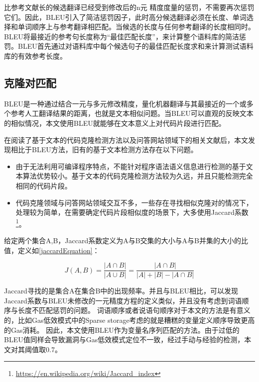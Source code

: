 比参考文献长的候选翻译已经受到修改后的n元 精度度量的惩罚，不需要再次惩罚它们。因此，BLEU引入了简洁惩罚因子，此时高分候选翻译必须在长度、单词选择和单词顺序上与参考翻译相匹配。当候选的长度与任何参考翻译的长度相同时。BLEU将最接近的参考句长度称为“最佳匹配长度”，来计算整个语料库的简洁惩罚。BLEU首先通过对语料库中每个候选句子的最佳匹配长度求和来计算测试语料库的有效参考长度。

\subsection{克隆对匹配}

BLEU是一种通过结合一元与多元修改精度，量化机器翻译与其最接近的一个或多个参考人工翻译结果的距离，也就是文本相似问题。当BLEU可以直观的反映文本的相似情况，本文使用BLEU就能够在文本意义上对代码片段进行匹配。

在阅读了基于文本的代码克隆检测方法以及问答网站领域下的相关文献后，本文发现相比于BLEU方法，旧有的基于文本检测方法存在以下问题。

\begin{itemize}
    \item 由于无法利用可编译程序特点，不能针对程序语法语义信息进行检测的基于文本算法优势较小。基于文本的代码克隆检测方法较为久远\cite{Ducasse}\cite{Koschke}，并且只能检测完全相同的代码片段。
    \item 代码克隆领域与问答网站领域交互不多，一些存在寻找相似克隆对的情况下，处理较为简单\cite{dicos}\cite{fisher1}，在需要确定代码片段相似度的场景下，大多使用Jaccard系数\footnote{{\url{https://en.wikipedia.org/wiki/Jaccard_index}}}。
\end{itemize}

给定两个集合A,B，Jaccard系数定义为A与B交集的大小与A与B并集的大小的比值，定义如\ref{jaccardEquation}：

\begin{equation}
    J\left ( A,B \right ) = \frac{|A\cap B|}{|A\cup B|} = \frac{|A\cap B|}{|A| + |B| - |A\cap B|}
    \label{jaccardEquation}
\end{equation}

Jaccard寻找的是集合A在集合B中的出现频率。并且与BLEU相比，可以发现Jaccard系数与BLEU\cite{bleu}未修改的一元精度方程的定义类似，并且没有考虑到词语顺序与长度不匹配惩罚的问题。
词语顺序或者说语句顺序对于本文的方法是有意义的，比如Gas低效模式中的Sparse storage考虑的就是糟糕的变量定义顺序导致更高的Gas消耗。
因此，本文使用BLEU作为变量名序列匹配的方法。由于过低的BLEU值同样会导致漏洞与Gas低效模式定位不一致，经过手动与经验的检测，本文对其阈值取0.7。

